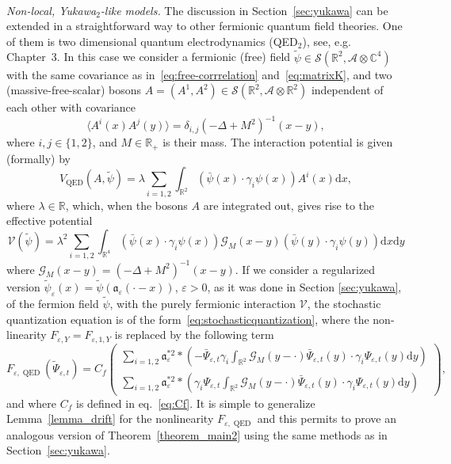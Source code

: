 \documentclass{article}
\newcommand{\asterisk}{\mathord{*}}
\newcommand{\mathd}{\mathrm{d}}
\newcommand{\tmop}[1]{\ensuremath{\operatorname{#1}}}
\newcommand{\tmtextit}[1]{{\itshape{#1}}}
\begin{document}
\

\tmtextit{Non-local, Yukawa$_2$-like models.} The discussion in
Section~\ref{sec:yukawa} can be extended in a straightforward way to other
fermionic quantum field theories. One of them is two dimensional quantum
electrodynamics (QED$_2$), see,
e.g.~{\cite{mastropietro_non-perturbative_2008}} Chapter~3. In this case we
consider a fermionic (free) field $\tilde{\psi} \in \mathcal{S} (\mathbb{R}^2,
\mathcal{A} \otimes \mathbb{C}^4)$ with the same covariance as
in~{\eqref{eq:free-corrrelation}} and~{\eqref{eq:matrixK}}, and two
(massive-free-scalar) bosons $A = (A^1, A^2) \in \mathcal{S} (\mathbb{R}^2,
\mathcal{A} \otimes \mathbb{R}^2)$ independent of each other with covariance
\[ \langle A^i (x) A^j (y) \rangle = \delta_{i, j} (- \Delta + M^2)^{- 1} (x
   - y), \]
where $i, j \in \{ 1, 2 \}$, and $M \in \mathbb{R}_+$ is their mass. The
interaction potential is given (formally) by
\[ V_{\tmop{QED}} (A, \tilde{\psi}) = \lambda \sum_{i = 1, 2}
   \int_{\mathbb{R}^2}  (\bar{\psi} (x) \cdot \gamma_i \psi (x)) A^i (x)
   \mathd x, \]
where $\lambda \in \mathbb{R}$, which, when the bosons $A$ are integrated out,
gives rise to the effective potential
\begin{equation}
  \mathcal{V} (\tilde{\psi}) = \lambda^2 \sum_{i = 1, 2} \int_{\mathbb{R}^4}
  (\bar{\psi} (x) \cdot \gamma_i \psi (x)) \mathcal{G}_M (x - y) (\bar{\psi}
  (y) \cdot \gamma_i \psi (y)) \mathd x \mathd y \label{eq:QED1}
\end{equation}
where $\mathcal{G}_M (x - y) = (- \Delta + M^2)^{- 1} (x - y)$. If we consider
a regularized version $\tilde{\psi}_{\varepsilon} (x) = \tilde{\psi}
(\mathfrak{a}_{\varepsilon} (\cdot - x))$, $\varepsilon > 0$, as it was done
in Section \ref{sec:yukawa}, of the fermion field $\tilde{\psi}$, with the
purely fermionic interaction $\mathcal{V}$, the stochastic quantization
equation is of the form~{\eqref{eq:stochasticquantization}}, where the
non-linearity $F_{\varepsilon, Y} = F_{\varepsilon, 1, Y}$ is replaced by the
following term
\[ F_{\varepsilon, \tmop{QED}} (\tilde{\Psi}_{\varepsilon, t}) = C_f \left(
   \begin{array}{l}
     \sum_{i = 1, 2} \mathfrak{a}_{\varepsilon}^{\asterisk 2} \ast \left( -
     \bar{\Psi}_{\varepsilon, t} \gamma_i \int_{\mathbb{R}^2} \mathcal{G}_M (y
     - \cdot) \bar{\Psi}_{\varepsilon, t} (y) \cdot \gamma_i
     \Psi_{\varepsilon, t} (y) \mathd y \right)\\
     \sum_{i = 1, 2} \mathfrak{a}_{\varepsilon}^{\asterisk 2} \ast \left(
     \gamma_i \Psi_{\varepsilon, t} \int_{\mathbb{R}^2} \mathcal{G}_M (y -
     \cdot) \bar{\Psi}_{\varepsilon, t} (y) \cdot \gamma_i \Psi_{\varepsilon,
     t} (y) \mathd y \right)
   \end{array} \right), \]
and where $C_f$ is defined in eq.~{\eqref{eq:Cf}}. It is simple to generalize
Lemma~\ref{lemma_drift} for the nonlinearity $F_{\varepsilon, \tmop{QED}}$ and
this permits to prove an analogous version of Theorem~\ref{theorem_main2}
using the same methods as in Section~\ref{sec:yukawa}.
\end{document}
